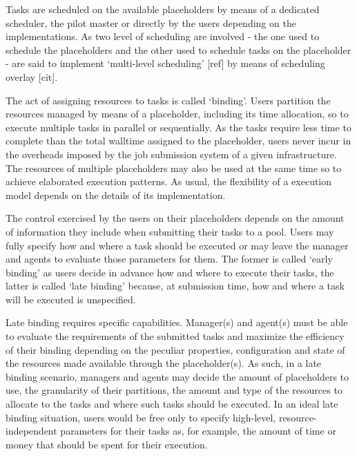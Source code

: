 \documentclass{sig-alternate}
\begin{document}

Tasks are scheduled on the available placeholders by means of a dedicated scheduler, the pilot master or directly by the users depending on the \pilotjobs implementations. As two level of scheduling are involved - the one used to schedule the placeholders and the other used to schedule tasks on the placeholder - \pilotjobs are said to implement `multi-level scheduling' [ref] by means of scheduling overlay [cit].


The act of assigning resources to tasks is called `binding'. Users partition the resources managed by means of a placeholder, including its time allocation, so to execute multiple tasks in parallel or sequentially. As the tasks require less time to complete than the total walltime assigned to the placeholder, users never incur in the overheads imposed by the job submission system of a given infrastructure. The resources of multiple placeholders may also be used at the same time so to achieve elaborated execution patterns. As usual, the flexibility of a \pilotjob execution model depends on the details of its implementation.


The control exercised by the users on their placeholders depends on the amount of information they include when submitting their tasks to a pool. Users may fully specify how and where a task should be executed or may leave the manager and agents to evaluate those parameters for them. The former is called `early binding' as users decide in advance how and where to execute their tasks, the latter is called `late binding' because, at submission time, how and where a task will be executed is unspecified.

Late binding requires specific capabilities. Manager(s) and agent(s) must be able to evaluate the requirements of the submitted tasks and maximize the efficiency of their binding depending on the peculiar properties, configuration and state of the resources made available through the placeholder(s). As such, in a late binding scenario, managers and agents may decide the amount of placeholders to use, the granularity of their partitions, the amount and type of the resources to allocate to the tasks and where such tasks should be executed. In an ideal late binding situation, users would be free only to specify high-level, resource-independent parameters for their tasks as, for example, the amount of time or money that should be spent for their execution.
\end{document}
